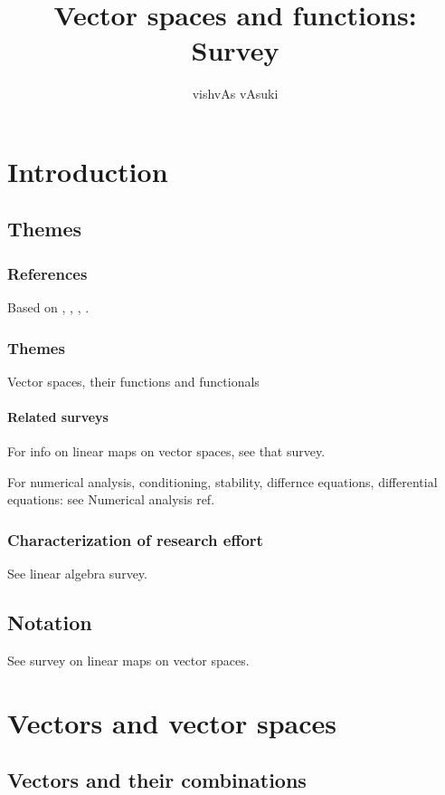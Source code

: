 \documentclass[oneside, article]{memoir}
\title{Vector spaces and functions: Survey}
\author{vishvAs vAsuki}
\begin{document}
\maketitle

\tableofcontents

\part{Introduction}
\chapter{Themes}
\section{References}
Based on \cite{strang}, \cite{trefBau}, \cite{hornJohnson} \cite{hornJohnsonTopics}, \cite{matrixCookbook}.

\section{Themes}
Vector spaces, their functions and functionals

\subsection{Related surveys}
For info on linear maps on vector spaces, see that survey.

For numerical analysis, conditioning, stability, differnce equations, differential equations: see Numerical analysis ref.

\section{Characterization of research effort}
See linear algebra survey.

\chapter{Notation}
See survey on linear maps on vector spaces.

\part{Vectors and vector spaces}
\chapter{Vectors and their combinations}
\end{document}
